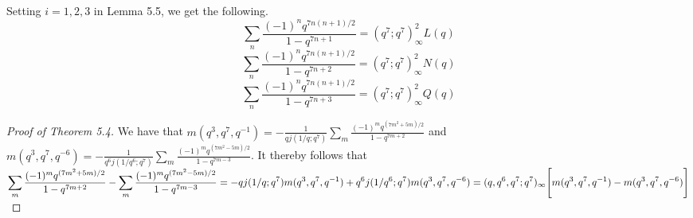 \documentclass[10pt,reqno]{amsart}
\begin{document}
Setting $i=1,2,3$ in Lemma 5.5, we get the following.
\begin{equation}
    \displaystyle\sum_{n}\displaystyle\frac{(-1)^nq^{7n(n+1)/2}}{1-q^{7n+1}}=(q^7;q^7)_{\infty}^2L(q)
\end{equation}
\begin{equation}
    \displaystyle\sum_{n}\displaystyle\frac{(-1)^nq^{7n(n+1)/2}}{1-q^{7n+2}}=(q^7;q^7)_{\infty}^2N(q)
\end{equation}
\begin{equation}
    \displaystyle\sum_{n}\displaystyle\frac{(-1)^nq^{7n(n+1)/2}}{1-q^{7n+3}}=(q^7;q^7)_{\infty}^2Q(q)
\end{equation}
\begin{proof}[Proof of Theorem 5.4]
We have that $m(q^3,q^7,q^{-1})=-\displaystyle\frac{1}{qj(1/q;q^7)}\displaystyle\sum_{m}\displaystyle\frac{(-1)^mq^{(7m^2+5m)/2}}{1-q^{7m+2}}$ and \\ $m(q^3,q^7,q^{-6})=-\displaystyle\frac{1}{q^6j(1/q^6;q^7)}\displaystyle\sum_{m}\displaystyle\frac{(-1)^mq^{(7m^2-5m)/2}}{1-q^{7m-3}}$. It thereby follows that\\
 
$\displaystyle\sum_{m}\displaystyle\frac{(-1)^mq^{(7m^2+5m)/2}}{1-q^{7m+2}}-\displaystyle\sum_{m}\displaystyle\frac{(-1)^mq^{(7m^2-5m)/2}}{1-q^{7m-3}}\\ \\
=-qj(1/q;q^7)m(q^3,q^7,q^{-1})+q^6j(1/q^6;q^7)m(q^3,q^7,q^{-6})
=(q,q^6,q^7;q^7)_{\infty}\Bigg[m(q^3,q^7,q^{-1})-m(q^3,q^7,q^{-6})\Bigg]$


\end{proof}
\end{document}
